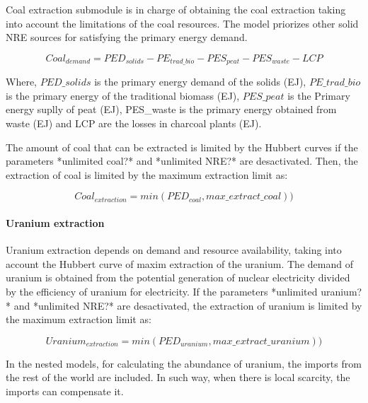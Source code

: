 Coal extraction submodule is in charge of obtaining the coal extraction taking into account the limitations of the coal resources. The model priorizes other solid NRE sources for satisfying the primary energy demand.

\begin{equation}
Coal_{demand}=PED_{solids}-PE_{trad\_bio}-PES_{peat}-PES_{waste}-LCP
\label{eq:coal-demand}
\end{equation}

Where, $PED\_solids$ is the primary energy demand of the solids (EJ), $PE\_trad\_bio$ is the primary energy of the traditional biomass (EJ), $PES\_peat$ is the Primary energy suplly of peat (EJ), PES\_waste is the primary energy obtained from waste (EJ) and LCP are the losses in charcoal plants (EJ).

The amount of coal that can be extracted is limited by the Hubbert curves if the parameters *unlimited coal?* and *unlimited NRE?* are desactivated. Then, the extraction of coal is limited by the maximum extraction limit as:

\begin{equation}
Coal_{extraction}=min(PED_{coal}, max\_extract\_coal))
\label{eq:coal-extraction}
\end{equation}

\paragraph{Uranium extraction}

Uranium extraction depends on demand and resource availability, taking into account the Hubbert curve of maxim extraction of the uranium. The demand of uranium is obtained from the potential generation of nuclear electricity divided by the efficiency of uranium for electricity. If the parameters *unlimited uranium?* and *unlimited NRE?* are desactivated, the extraction of uranium is limited by the maximum extraction limit as:

\begin{equation}
Uranium_{extraction}=min(PED_{uranium}, max\_extract\_uranium))
\label{eq:uranium-extraction}
\end{equation}

In the nested models, for calculating the abundance of uranium, the imports from the rest of the world are included. In such way, when there is local scarcity, the imports can compensate it.


